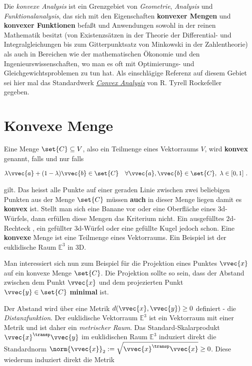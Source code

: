 \documentclass[
  12pt,
  a4paper,
  twoside,
  titlepage,
  openright,
  numbers=noenddot,
  chapterprefix=true,
  headings=optiontohead,
  svgnames,
  dvipsnames]{scrreprt}
\begin{document}
Die \emph{konvexe Analysis} ist ein Grenzgebiet von \emph{Geometrie},
\emph{Analysis} und \emph{Funktionalanalysis}, das sich mit den
Eigenschaften \textbf{konvexer Mengen} und \textbf{konvexer Funktionen}
befaßt und Anwendungen sowohl in der reinen Mathematik besitzt (von
Existenzsätzen in der Theorie der Differential- und Integralgleichungen
bis zum Gitterpunktsatz von Minkowski in der Zahlentheorie) als auch in
Bereichen wie der mathematischen Ökonomie und den
Ingenieurswissenschaften, wo man es oft mit Optimierungs- und
Gleichgewichtsproblemen zu tun hat. Als einschlägige Referenz auf diesem
Gebiet sei hier mal das Standardwerk \href{}{\emph{Convex Analysis}} von
R. Tyrell Rockefeller gegeben.

\hypertarget{konvexe-menge}{%
\section{Konvexe Menge}\label{konvexe-menge}}

Eine Menge \(\set{C} \subseteq V\), also ein Teilmenge eines Vektorraums
\(V\), wird \textbf{konvex} genannt, falls und nur falls

\[\begin{align}
\lambda \vvec{a} + (1-\lambda) \vvec{b} \in \set{C} \quad \forall \vvec{a},\vvec{b} \in \set{C}, \ \lambda \in [0,1] \ .
\end{align}\]

gilt. Das heisst alle Punkte auf einer geraden Linie zwischen zwei
beliebigen Punkten aus der Menge \(\set{C}\) müssen \textbf{auch} in
dieser Menge liegen damit es \textbf{konvex} ist. Stellt man sich eine
Banane vor oder eine Oberfläche eines \(3\)d-Würfels, dann erfüllen
diese Mengen das Kriterium nicht. Ein ausgefülltes \(2\)d-Rechteck , ein
gefüllter \(3\)d-Würfel oder eine gefüllte Kugel jedoch schon. Eine
\textbf{konvexe} Menge ist eine Teilmenge eines Vektorraums. Ein
Beispiel ist der euklidische Raum \(\mathbb{E}^3\) in \(3\)D.

Man interessiert sich nun zum Beispiel für die Projektion eines Punktes
\(\vvec{x}\) auf ein konvexe Menge \(\set{C}\). Die Projektion sollte so
sein, dass der Abstand zwischen dem Punkt \(\vvec{x}\) und dem
projezierten Punkt \(\vvec{y} \in \set{C}\) \textbf{minimal} ist.

Der Abstand wird über eine Metrik \(d(\vvec{x},\vvec{y}) \geq 0\)
definiert - die \emph{Distanzfunktion}. Der euklidische Vektorraum
\(\mathbb{E}^3\) ist ein Vektorraum mit einer Metrik und ist daher ein
\emph{metrischer Raum}. Das Standard-Skalarprodukt
\(\vvec{x}^\transp \vvec{y}\) im euklidischen Raum \(\mathbb{E}^3\)
induziert direkt die Standardnorm
\(\norm{\vvec{x}}_2 := \sqrt{\vvec{x}^\transp \vvec{x}} \geq 0\). Diese
wiederum induziert direkt die Metrik
\end{document}

